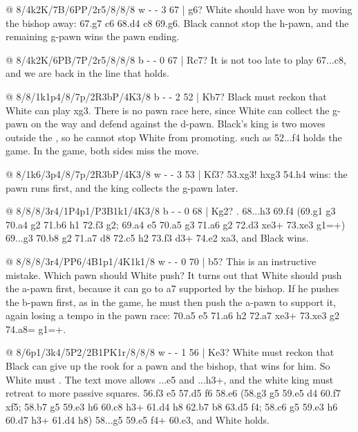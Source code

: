 @ 8/4k2K/7B/6PP/2r5/8/8/8 w - - 3 67 | g6?
White should have won by moving the bishop away: 67.\B g7 \R c6 68.\B d4 \R c8 69.\K g6. Black
cannot stop the h-pawn, and the remaining g-pawn wins the pawn ending.

@ 8/4k2K/6PB/7P/2r5/8/8/8 b - - 0 67 | Rc7?
It is not too late to play 67...\R c8, and we are back in the line that holds.

@ 8/8/1k1p4/8/7p/2R3bP/4K3/8 b - - 2 52 | Kb7?
Black must reckon that White can play \R xg3. There is no pawn race here, since White can collect
the g-pawn on the way and defend against the d-pawn. Black's king is two moves outside the
, so he cannot stop
White from promoting.  such as 52...\B f4 holds the
game. In the game, both sides miss the move.

@ 8/1k6/3p4/8/7p/2R3bP/4K3/8 w - - 3 53 | Kf3?
53.\R xg3! hxg3 54.h4 wins: the pawn runs first, and the king collects the g-pawn later.

@ 8/8/8/3r4/1P4p1/P3B1k1/4K3/8 b - - 0 68 | Kg2?
.
68...\K h3 69.\B f4 (69.\B g1 g3 70.a4 \K g2 71.\B b6 \K h1 72.\K f3 g2; 69.a4 \R e5 70.a5 g3 71.a6 g2
72.\K d3 \R xe3+ 73.\K xe3 g1=\Q+) 69...g3 70.\B b8 g2 71.\B a7 \R d8 72.\B c5 \K h2 73.\K f3 \R d3+
74.\K e2 \R xa3, and Black wins.

@ 8/8/8/3r4/PP6/4B1p1/4K1k1/8 w - - 0 70 | b5?
This is an instructive mistake. Which pawn should White push? It turns out that White should push
the a-pawn first, because it can go to a7 supported by the bishop. If he pushes the b-pawn first,
as in the game, he must then push the a-pawn to support it, again losing a tempo in the pawn race:
70.a5 \R e5 71.a6 \K h2 72.a7 \R xe3+ 73.\K xe3 g2 74.a8=\Q{} g1=\Q+.

@ 8/6p1/3k4/5P2/2B1PK1r/8/8/8 w - - 1 56 | Ke3?
White must reckon that Black can give up the rook for a pawn and the bishop,  that wins for him. So White must
. The text move allows
...\K e5 and ...\R h3+, and the white king must retreat to more passive squares. 56.\K f3 \K e5
57.\B d5 \K f6 58.\B e6 (58.\K g3 \K g5 59.e5 \R d4 60.\B f7 \K xf5; 58.\B b7 \K g5 59.\K e3 \R h6
60.\B c8 \R h3+ 61.\K d4 \R h8 62.\B b7 \R b8 63.\B d5 \K f4; 58.\B c6 \K g5 59.\K e3 \R h6 60.\B d7
\R h3+ 61.\K d4 \R h8) 58...\K g5 59.e5 \R f4+ 60.\K e3, and White holds.


